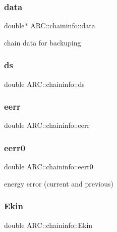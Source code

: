 \subsubsection{\texorpdfstring{data}{data}}
{\footnotesize\ttfamily double$\ast$ A\+R\+C\+::chaininfo\+::data}



chain data for backuping 

\hypertarget{classARC_1_1chaininfo_af689a2456268b30374ae6046704511f0}{}\label{classARC_1_1chaininfo_af689a2456268b30374ae6046704511f0} 
\subsubsection{\texorpdfstring{ds}{ds}}
{\footnotesize\ttfamily double A\+R\+C\+::chaininfo\+::ds}

\hypertarget{classARC_1_1chaininfo_a2a4787b1089da59e9ad8f008d211faed}{}\label{classARC_1_1chaininfo_a2a4787b1089da59e9ad8f008d211faed} 
\subsubsection{\texorpdfstring{eerr}{eerr}}
{\footnotesize\ttfamily double A\+R\+C\+::chaininfo\+::eerr}

\hypertarget{classARC_1_1chaininfo_aa25da11049199a727d6d94c172ed93ae}{}\label{classARC_1_1chaininfo_aa25da11049199a727d6d94c172ed93ae} 
\subsubsection{\texorpdfstring{eerr0}{eerr0}}
{\footnotesize\ttfamily double A\+R\+C\+::chaininfo\+::eerr0}



energy error (current and previous) 

\hypertarget{classARC_1_1chaininfo_a7732d57314ddb49eb996eb41056a0140}{}\label{classARC_1_1chaininfo_a7732d57314ddb49eb996eb41056a0140} 
\subsubsection{\texorpdfstring{Ekin}{Ekin}}
{\footnotesize\ttfamily double A\+R\+C\+::chaininfo\+::\+Ekin}

